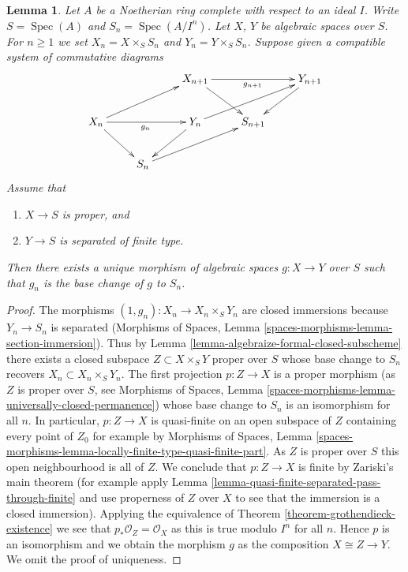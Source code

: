 \documentclass[10pt,a4paper]{amsart}
\theoremstyle{plain}
\newtheorem{lemma}[subsection]{Lemma}
\theoremstyle{definition}
\theoremstyle{remark}
\numberwithin{equation}{subsection}
\def\Spec{\mathop{\mathrm{Spec}}}
\begin{document}
\begin{lemma}
\label{lemma-algebraize-morphism}
Let $A$ be a Noetherian ring complete with respect to an ideal $I$.
Write $S = \Spec(A)$ and $S_n = \Spec(A/I^n)$. Let $X$, $Y$ be algebraic
spaces over $S$. For $n \geq 1$ we set $X_n = X \times_S S_n$ and
$Y_n = Y \times_S S_n$. Suppose given a compatible system of
commutative diagrams
$$
\xymatrix{
& & X_{n + 1} \ar[rd] \ar[rr]_{g_{n + 1}} & & Y_{n + 1} \ar[ld] \\
X_n \ar[rru] \ar[rd] \ar[rr]_{g_n} & & Y_n \ar[rru] \ar[ld] & S_{n + 1} \\
& S_n \ar[rru]
}
$$
Assume that
\begin{enumerate}
\item $X \to S$ is proper, and
\item $Y \to S$ is separated of finite type.
\end{enumerate}
Then there exists a unique morphism of algebraic spaces $g : X \to Y$
over $S$ such that $g_n$ is the base change of $g$ to $S_n$.
\end{lemma}

\begin{proof}
The morphisms $(1, g_n) : X_n \to X_n \times_S Y_n$ are closed immersions
because $Y_n \to S_n$ is separated
(Morphisms of Spaces, Lemma \ref{spaces-morphisms-lemma-section-immersion}).
Thus by Lemma \ref{lemma-algebraize-formal-closed-subscheme}
there exists a closed subspace $Z \subset X \times_S Y$
proper over $S$ whose base change to $S_n$ recovers
$X_n \subset X_n \times_S Y_n$. The first projection $p : Z \to X$
is a proper morphism (as $Z$ is proper over $S$, see
Morphisms of Spaces, Lemma
\ref{spaces-morphisms-lemma-universally-closed-permanence})
whose base change to $S_n$ is an isomorphism for all $n$.
In particular, $p : Z \to X$ is quasi-finite on an open subspace
of $Z$ containing every point of $Z_0$ for example by
Morphisms of Spaces, Lemma
\ref{spaces-morphisms-lemma-locally-finite-type-quasi-finite-part}.
As $Z$ is proper over $S$ this open neighbourhood is all of $Z$.
We conclude that $p : Z \to X$ is finite by Zariski's main theorem
(for example apply
Lemma \ref{lemma-quasi-finite-separated-pass-through-finite}
and use properness of $Z$ over $X$ to see that the immersion is
a closed immersion). Applying the equivalence of
Theorem \ref{theorem-grothendieck-existence}
we see that $p_*\mathcal{O}_Z = \mathcal{O}_X$ as this is true
modulo $I^n$ for all $n$. Hence $p$ is an isomorphism and we obtain
the morphism $g$ as the composition $X \cong Z \to Y$.
We omit the proof of uniqueness.
\end{proof}
\end{document}
